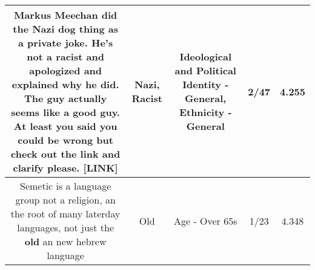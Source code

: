 \documentclass[11pt]{article}
\newlength\mylength
\begin{document}
\begin{center}
\begin{longtable}{|C{.65\mylength}|C{.30\mylength}|C{.12\mylength}|C{.12\mylength}|C{.12\mylength}|}
  \small Markus Meechan did the \textbf{Nazi} dog thing as a private joke. He's not a \textbf{racist} and apologized and explained why he did. The guy actually seems like a good guy. At least you said you could be wrong but check out the link and clarify please. [LINK] \normalsize   & Nazi, Racist &  Ideological and Political Identity - General, Ethnicity - General & 2/47 & 4.255 \\  \hline
  \small Semetic is a language group not a religion, an the root of many laterday languages, not just the \textbf{old} an new hebrew language\normalsize   & Old & Age - Over 65s & 1/23 & 4.348 \\  \hline

\end{longtable}
\end{center}
\end{document}

